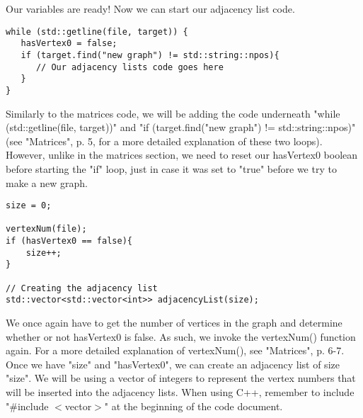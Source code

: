 \documentclass{article}
\begin{document}
Our variables are ready! Now we can start our adjacency list code.

\begin{lstlisting}
while (std::getline(file, target)) {
   hasVertex0 = false;
   if (target.find("new graph") != std::string::npos){
      // Our adjacency lists code goes here
   }
}
\end{lstlisting}
Similarly to the matrices code, we will be adding the code underneath "while (std::getline(file, target))" and "if (target.find("new graph") != std::string::npos)" (see "Matrices", p. 5, for a more detailed explanation of these two loops). However, unlike in the matrices section, we need to reset our hasVertex0 boolean before starting the "if" loop, just in case it was set to "true" before we try to make a new graph.

\begin{lstlisting}
size = 0;

vertexNum(file);
if (hasVertex0 == false){
    size++;
}

// Creating the adjacency list
std::vector<std::vector<int>> adjacencyList(size);
\end{lstlisting}
We once again have to get the number of vertices in the graph and determine whether or not hasVertex0 is false. As such, we invoke the vertexNum() function again. For a more detailed explanation of vertexNum(), see "Matrices", p. 6-7. \\
Once we have "size" and "hasVertex0", we can create an adjacency list of size "size". We will be using a vector of integers to represent the vertex numbers that will be inserted into the adjacency lists. When using C++, remember to include "\#include $<$vector$>$" at the beginning of the code document. \\
\end{document}
